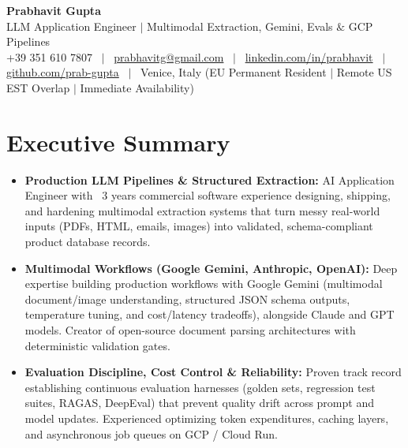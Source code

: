 \documentclass[a4paper,10pt]{article}
\begin{document}
\begin{minipage}[c]{0.80\textwidth}
  {\Huge\bfseries Prabhavit Gupta}\\[3pt]
  {\color{accent}\large LLM Application Engineer $\vert$ Multimodal Extraction, Gemini, Evals $\&$ GCP Pipelines}\\[6pt]
  {\footnotesize +39 351 610 7807 ~$\vert$~
  \href{mailto:prabhavitg@gmail.com}{prabhavitg@gmail.com} ~$\vert$~
  \href{https://www.linkedin.com/in/prabhavit/}{linkedin.com/in/prabhavit} ~$\vert$~
  \href{https://github.com/prab-gupta}{github.com/prab-gupta} ~$\vert$~
  Venice, Italy (EU Permanent Resident $\vert$ Remote US EST Overlap $\vert$ Immediate Availability)}
\end{minipage}\hfill

\vspace{6pt}

\section{Executive Summary}
\begin{itemize}
  \item \textbf{Production LLM Pipelines \& Structured Extraction:} AI Application Engineer with ~3 years commercial software experience designing, shipping, and hardening multimodal extraction systems that turn messy real-world inputs (PDFs, HTML, emails, images) into validated, schema-compliant product database records.
  \item \textbf{Multimodal Workflows (Google Gemini, Anthropic, OpenAI):} Deep expertise building production workflows with Google Gemini (multimodal document/image understanding, structured JSON schema outputs, temperature tuning, and cost/latency tradeoffs), alongside Claude and GPT models. Creator of open-source document parsing architectures with deterministic validation gates.
  \item \textbf{Evaluation Discipline, Cost Control \& Reliability:} Proven track record establishing continuous evaluation harnesses (golden sets, regression test suites, RAGAS, DeepEval) that prevent quality drift across prompt and model updates. Experienced optimizing token expenditures, caching layers, and asynchronous job queues on GCP / Cloud Run.
\end{itemize}

\end{document}
